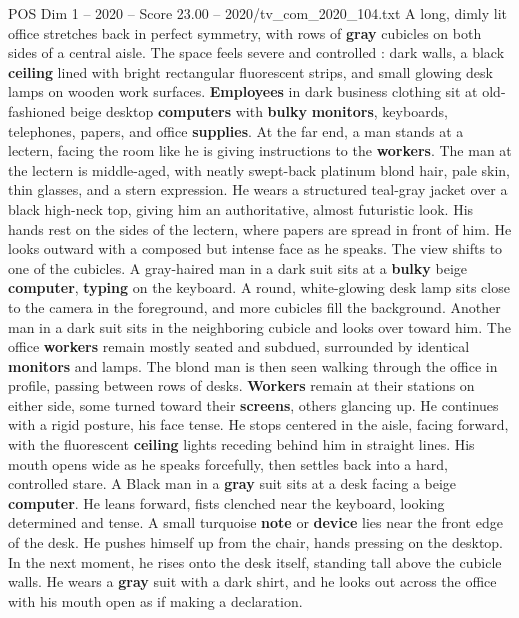 \begin{textsample}{POS Dim 1 – 2020 – Score 23.00 – 2020/tv\_com\_2020\_104.txt}  \label{ex:f1_pos_004}
A long, dimly lit office stretches back in perfect symmetry, with rows of \textbf{gray} cubicles on both sides of a central aisle.
The space feels severe and controlled : dark walls, a black \textbf{ceiling} lined with bright rectangular fluorescent strips, and small glowing desk lamps on wooden work surfaces. \textbf{Employees} in dark business clothing sit at old-fashioned beige desktop \textbf{computers} with \textbf{bulky} \textbf{monitors}, keyboards, telephones, papers, and office \textbf{supplies}.
At the far end, a man stands at a lectern, facing the room like he is giving instructions to the \textbf{workers}.
The man at the lectern is middle-aged, with neatly swept-back platinum blond hair, pale skin, thin glasses, and a stern expression.
He wears a structured teal-gray jacket over a black high-neck top, giving him an authoritative, almost futuristic look.
His hands rest on the sides of the lectern, where papers are spread in front of him.
He looks outward with a composed but intense face as he speaks.
The view shifts to one of the cubicles.
A gray-haired man in a dark suit sits at a \textbf{bulky} beige \textbf{computer}, \textbf{typing} on the keyboard.
A round, white-glowing desk lamp sits close to the camera in the foreground, and more cubicles fill the background.
Another man in a dark suit sits in the neighboring cubicle and looks over toward him.
The office \textbf{workers} remain mostly seated and subdued, surrounded by identical \textbf{monitors} and lamps.
The blond man is then seen walking through the office in profile, passing between rows of desks. \textbf{Workers} remain at their stations on either side, some turned toward their \textbf{screens}, others glancing up.
He continues with a rigid posture, his face tense.
He stops centered in the aisle, facing forward, with the fluorescent \textbf{ceiling} lights receding behind him in straight lines.
His mouth opens wide as he speaks forcefully, then settles back into a hard, controlled stare.
A Black man in a \textbf{gray} suit sits at a desk facing a beige \textbf{computer}.
He leans forward, fists clenched near the keyboard, looking determined and tense.
A small turquoise \textbf{note} or \textbf{device} lies near the front edge of the desk.
He pushes himself up from the chair, hands pressing on the desktop.
In the next moment, he rises onto the desk itself, standing tall above the cubicle walls.
He wears a \textbf{gray} suit with a dark shirt, and he looks out across the office with his mouth open as if making a declaration.

\end{textsample}
